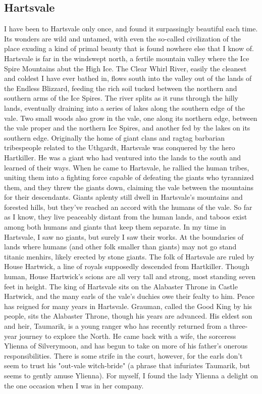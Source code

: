 \documentclass[10pt,a4paper,twoside,twocolumn,openany,bg=print,nodeprecatedcode]{dndbook}
\begin{document}
\subsection{Hartsvale}
I have been to Hartsvale only once, and found it surpassingly beautiful each time. Its wonders are wild and untamed, with even the so-called civilization of the place exuding a kind of primal beauty that is found nowhere else that I know of.
Hartsvale is far in the windswept north, a fertile mountain valley where the Ice Spire Mountains abut the High Ice. The Clear Whirl River, easily the cleanest and coldest I have ever bathed in, flows south into the valley out of the lands of the Endless Blizzard, feeding the rich soil tucked between the northern and southern arms of the Ice Spires. The river splits as it runs through the hilly lands, eventually draining into a series of lakes along the southern edge of the vale. Two small woods also grow in the vale, one along its northern edge, between the vale proper and the northern Ice Spires, and another fed by the lakes on its southern edge.
Originally the home of giant clans and ragtag barbarian tribespeople related to the Uthgardt, Hartsvale was conquered by the hero Hartkiller. He was a giant who had ventured into the lands to the south and learned of their ways. When he came to Hartsvale, he rallied the human tribes, uniting them into a fighting force capable of defeating the giants who tyrannized them, and they threw the giants down, claiming the vale between the mountains for their descendants.
Giants aplenty still dwell in Hartsvale's mountains and forested hills, but they've reached an accord with the humans of the vale. So far as I know, they live peaceably distant from the human lands, and taboos exist among both humans and giants that keep them separate. In my time in Hartsvale, I saw no giants, but surely I saw their works. At the boundaries of lands where humans (and other folk smaller than giants) may not go stand titanic menhirs, likely erected by stone giants.
The folk of Hartsvale are ruled by House Hartwick, a line of royals supposedly descended from Hartkiller. Though human, House Hartwick's scions are all very tall and strong, most standing seven feet in height. The king of Hartsvale sits on the Alabaster Throne in Castle Hartwick, and the many earls of the vale's duchies owe their fealty to him.
Peace has reigned for many years in Hartsvale. Grauman, called the Good King by his people, sits the Alabaster Throne, though his years are advanced. His eldest son and heir, Taumarik, is a young ranger who has recently returned from a three-year journey to explore the North. He came back with a wife, the sorceress Ylienna of Silverymoon, and has begun to take on more of his father's onerous responsibilities. There is some strife in the court, however, for the earls don't seem to trust his "out-vale witch-bride" (a phrase that infuriates Taumarik, but seems to gently amuse Ylienna). For myself, I found the lady Ylienna a delight on the one occasion when I was in her company.
\end{document}
